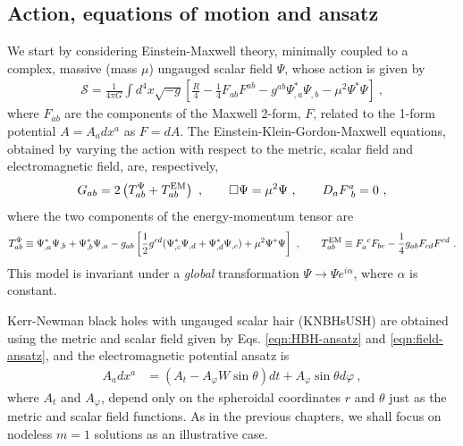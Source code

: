 \subsection{Action, equations of motion and ansatz}
\label{sec_mofrl}
We start by considering Einstein-Maxwell theory, minimally coupled to a complex, massive (mass $\mu$)  ungauged scalar field $\Psi$, whose action is given by
%
\begin{eqnarray}
  \label{KNaction}
 \mathcal{S} = \frac{1}{4\pi G}\int d^4x \sqrt{-g}\left[\frac{R}{4}- \frac{1}{4}F_{ab}F^{ab}- g^{ab}\Psi^*_{,a}\Psi_{,b} -\mu^2\Psi^*\Psi \right]\ ,  
\end{eqnarray}  
where $F_{ab}$ are the components of the Maxwell 2-form, $F$, related to the 1-form potential $A=A_adx^a$ as $F=dA$. The Einstein-Klein-Gordon-Maxwell equations, obtained by varying the action with respect to the metric, scalar field and electromagnetic field, are, respectively,
%
%
\begin{equation}
G_{ab}  = 2\left( T_{ab}^\Psi+T_{ab} ^{\rm EM} \right)\ , \qquad \Box \Psi =\mu^2\Psi \ , \qquad D_aF^a_{~b}=0 \ ,
\label{KNeom}
\end{equation}
where the two components of the energy-momentum tensor are
%
\begin{equation}
\label{KNemt}
T_{ab}^\Psi \equiv  
 \Psi_{ , a}^*\Psi_{,b}
+\Psi_{,b}^*\Psi_{,a} 
-g_{ab}  \left[ \frac{1}{2} g^{cd} 
 ( \Psi_{,c}^*\Psi_{,d}+
\Psi_{,d}^*\Psi_{,c} )+\mu^2 \Psi^*\Psi\right] \ , \qquad
 T_{ab}^{\rm EM} \equiv F_a^{~c}F_{bc} - \frac{1}{4}g_{ab}F_{cd}F^{cd} \ .
\end{equation}
This model is invariant under a \textit{global} transformation $\Psi\rightarrow \Psi e^{i\alpha}$, where $\alpha$ is constant.



Kerr-Newman black holes with ungauged scalar hair (KNBHsUSH) are obtained using the metric and scalar field given by Eqs. \eqref{eqn:HBH-ansatz} and \eqref{eqn:field-ansatz}, and the electromagnetic potential ansatz is
%
\begin{align}
 \label{electric_ansatz}
 A_adx^a &= \left( A_t - A_\varphi W\sin\theta \right)dt + A_\varphi\sin\theta d\varphi \ ,
\end{align}
where $A_t$ and $A_\varphi$, depend only on the spheroidal coordinates $r$ and $\theta$ just as the metric and scalar field functions.
As in the previous chapters, we shall focus on nodeless $m=1$ solutions as an illustrative case.

